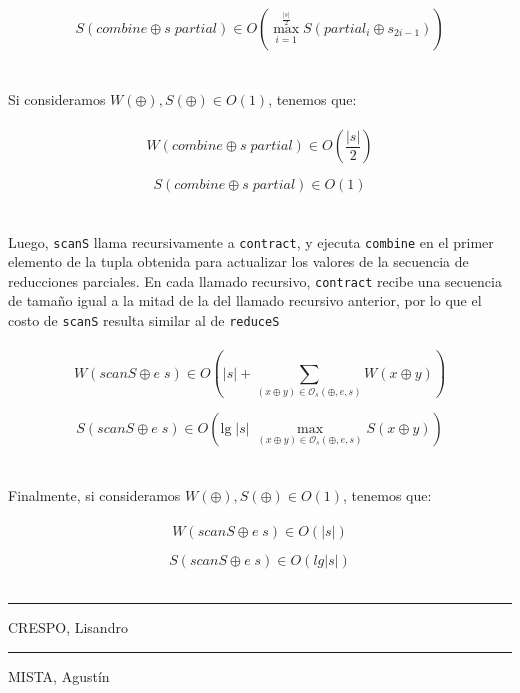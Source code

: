 \documentclass[a4paper,10pt]{article}
\begin{document}
\begin{equation*}
    S \left( combine \oplus s \; partial \right) \in
    O \left( \max_{i=1}^{\frac{\vert s \vert}{2}} S \left( partial_{i} \oplus s_{2i-1} \right) \right)
\end{equation*}
\\
\\
		Si consideramos $W(\oplus), S(\oplus) \in O(1)$, tenemos que:
\\
\\		
		\begin{equation*}
			W \left( combine \oplus s \; partial \right) \in O \left( \frac{\vert s \vert}{2} \right)
		\end{equation*}
		
		\begin{equation*}
			S \left( combine \oplus s \; partial \right) \in O \left( 1 \right)
		\end{equation*}
\\
\\	
		Luego, \texttt{scanS} llama recursivamente a \texttt{contract}, y ejecuta \texttt{combine} en el primer elemento de la tupla obtenida para actualizar los valores de la secuencia de reducciones parciales.
		En cada llamado recursivo, \texttt{contract} recibe una secuencia de tamaño igual a la mitad de la del llamado recursivo anterior, por lo que el costo de \texttt{scanS} resulta similar al de \texttt{reduceS}
\\
\\
		\begin{equation*}
			W \left( scanS \oplus e \; s \right) \in
			O \left( \vert s \vert + \sum_{(x \oplus y) \in \mathcal{O}_s(\oplus,e,s)} W \left( x \oplus y \right) \right)
		\end{equation*}

		\begin{equation*}
			S \left( scanS \oplus e \; s \right) \in
			O \left( \text{lg} \; \vert s \vert \; \max_{(x \oplus y) \in \mathcal{O}_s(\oplus,e,s)} S \left( x \oplus y \right) \right)
		\end{equation*}
\\
\\		
		Finalmente, si consideramos $W(\oplus), S(\oplus) \in O(1)$, tenemos que:
\\
\\		
		\begin{equation*}
			W \left( scanS \oplus e \; s  \right) \in O \left( \vert s \vert \right)
		\end{equation*}
		
		\begin{equation*}
			S \left( scanS \oplus e \; s  \right) \in O \left( lg\vert s \vert \right)
		\end{equation*}
\pagebreak
\\
\vspace{\fill}
\begin{multicols}{2}
	\hrule
	\vspace{5pt}
	CRESPO, Lisandro \\
	\linebreak

	\hrule
	\vspace{5pt}
	MISTA, Agustín \\
\end{multicols}
\end{document}
